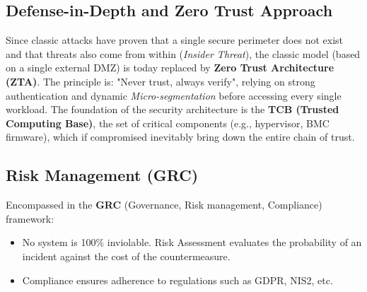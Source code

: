 \subsection{Defense-in-Depth and Zero Trust Approach}
Since classic attacks have proven that a single secure perimeter does not exist and that threats also come from within (\textit{Insider Threat}), the classic model (based on a single external DMZ) is today replaced by \textbf{Zero Trust Architecture (ZTA)}. The principle is: "Never trust, always verify", relying on strong authentication and dynamic \textit{Micro-segmentation} before accessing every single workload.
The foundation of the security architecture is the \textbf{TCB (Trusted Computing Base)}, the set of critical components (e.g., hypervisor, BMC firmware), which if compromised inevitably bring down the entire chain of trust.

\subsection{Risk Management (GRC)}
Encompassed in the \textbf{GRC} (Governance, Risk management, Compliance) framework:
\begin{itemize}
    \item No system is 100\% inviolable. Risk Assessment evaluates the probability of an incident against the cost of the countermeasure.
    \item Compliance ensures adherence to regulations such as GDPR, NIS2, etc.
\end{itemize}
